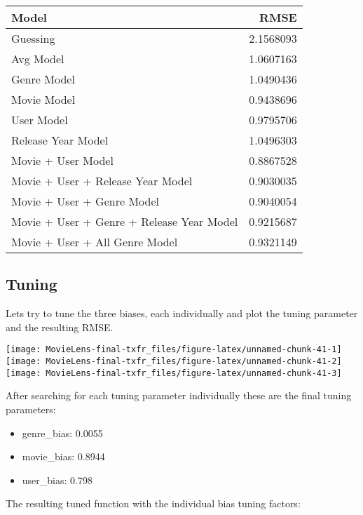 \documentclass[
]{article}
\providecommand{\tightlist}{%
  \setlength{\itemsep}{0pt}\setlength{\parskip}{0pt}}
\begin{document}
\begin{tabular}{l|r}
\hline
Model & RMSE\\
\hline
Guessing & 2.1568093\\
\hline
Avg Model & 1.0607163\\
\hline
Genre Model & 1.0490436\\
\hline
Movie Model & 0.9438696\\
\hline
User Model & 0.9795706\\
\hline
Release Year Model & 1.0496303\\
\hline
Movie + User Model & 0.8867528\\
\hline
Movie + User + Release Year Model & 0.9030035\\
\hline
Movie + User + Genre Model & 0.9040054\\
\hline
Movie + User + Genre + Release Year Model & 0.9215687\\
\hline
Movie + User + All Genre Model & 0.9321149\\
\hline
\end{tabular}

\newpage

\hypertarget{tuning}{%
\subsection{Tuning}\label{tuning}}

Lets try to tune the three biases, each individually and plot the tuning
parameter and the resulting RMSE.

\texttt{[image: MovieLens-final-txfr\_files/figure-latex/unnamed-chunk-41-1]}
\texttt{[image: MovieLens-final-txfr\_files/figure-latex/unnamed-chunk-41-2]}
\texttt{[image: MovieLens-final-txfr\_files/figure-latex/unnamed-chunk-41-3]}

After searching for each tuning parameter individually these are the
final tuning parameters:

\begin{itemize}
\tightlist
\item
  genre\_bias: 0.0055
\item
  movie\_bias: 0.8944
\item
  user\_bias: 0.798
\end{itemize}

The resulting tuned function with the individual bias tuning factors:
\end{document}
